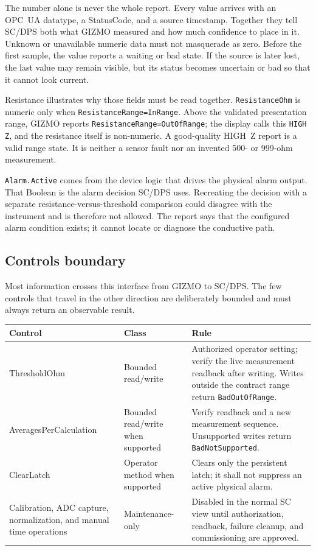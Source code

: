 \documentclass{cernatlasnote}
\newcommand{\code}[1]{\nolinkurl{#1}}
\begin{document}
The number alone is never the whole report. Every value arrives with an OPC~UA
datatype, a StatusCode, and a source timestamp. Together they tell SC/DPS both
what GIZMO measured and how much confidence to place in it. Unknown or
unavailable numeric data must not masquerade as zero. Before the first sample,
the value reports a waiting or bad state. If the source is later lost, the last
value may remain visible, but its status becomes uncertain or bad so that it
cannot look current.

Resistance illustrates why those fields must be read together.
\code{ResistanceOhm} is numeric only when
\code{ResistanceRange=InRange}. Above the validated presentation range, GIZMO
reports \code{ResistanceRange=OutOfRange}; the display calls this
\code{HIGH Z}, and the resistance itself is non-numeric. A good-quality
HIGH~Z report is a valid range state. It is neither a sensor fault nor an
invented 500- or 999-ohm measurement.

\code{Alarm.Active} comes from the device logic that drives the physical alarm
output. That Boolean is the alarm decision SC/DPS uses. Recreating the decision
with a separate resistance-versus-threshold comparison could disagree with the
instrument and is therefore not allowed. The report says that the configured
alarm condition exists; it cannot locate or diagnose the conductive path.

\subsection{Controls boundary}

Most information crosses this interface from GIZMO to SC/DPS. The few controls
that travel in the other direction are deliberately bounded and must always
return an observable result.

\begin{longtable}{L{0.31\textwidth} L{0.21\textwidth} L{0.38\textwidth}}
\toprule
\textbf{Control} & \textbf{Class} & \textbf{Rule} \\
\midrule
ThresholdOhm & Bounded read/write & Authorized operator setting;
verify the live measurement readback after writing. Writes outside the
contract range return \code{BadOutOfRange}. \\
AveragesPerCalculation & Bounded read/write when supported &
Verify readback and a new measurement sequence. Unsupported writes return
\code{BadNotSupported}. \\
ClearLatch & Operator method when supported & Clears only the
persistent latch; it shall not suppress an active physical alarm. \\
Calibration, ADC capture, normalization, and manual time operations &
Maintenance-only & Disabled in the normal SC view until authorization,
readback, failure cleanup, and commissioning are approved. \\
\bottomrule
\end{longtable}
\end{document}
